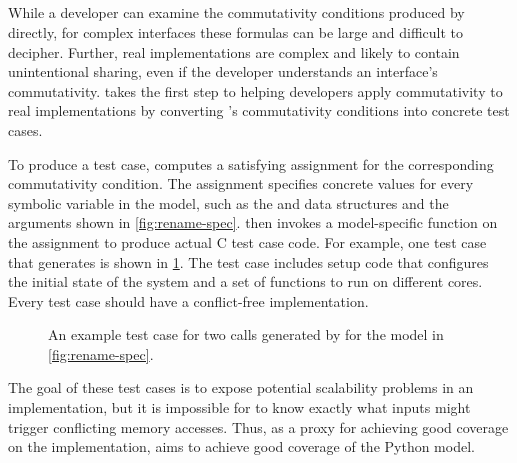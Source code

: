 \subsection{\testgen}
\label{sec:tool:generator}

While a developer can examine the commutativity conditions
produced by \analyzer directly, for complex interfaces these formulas
can be large and difficult to decipher.  Further, real implementations
are complex and likely to contain unintentional sharing, even if the
developer understands an interface's commutativity.  \testgen takes
the first step to helping developers apply commutativity to real
implementations by converting \analyzer's commutativity conditions into
concrete test cases.

To produce a test case, \testgen computes
a satisfying assignment for the corresponding commutativity condition.
The assignment specifies concrete values for every symbolic variable in
the model, such as the  and  data structures
and the  arguments shown in \cref{fig:rename-spec}.
\testgen then invokes a model-specific function on the assignment
to produce actual C test case code.  For example, one test
case that \testgen generates is shown in \cref{fig:testgen}.
The test case includes setup code that configures the initial state of
the system and a set of functions to run on different cores. Every
\testgen test case should have a conflict-free implementation.

\begin{figure}
\caption{An example test case for two  calls generated by
         \testgen for the model in \cref{fig:rename-spec}.}
\label{fig:testgen}
\end{figure}

The goal of these test cases is to expose potential scalability problems
in an implementation, but it is impossible for \testgen to know
exactly what inputs might trigger conflicting memory accesses.  Thus, as a
proxy for achieving good coverage on the implementation, \testgen
aims to achieve good coverage of the Python model.

